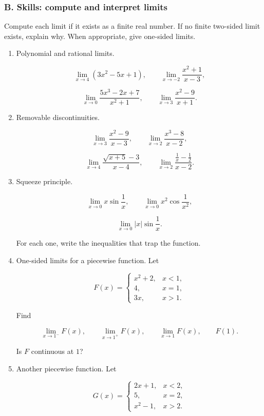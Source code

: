 \subsubsection*{B. Skills: compute and interpret limits}

Compute each limit if it exists as a finite real number.  If no finite two-sided limit exists, explain why.  When appropriate, give one-sided limits.

\begin{enumerate}
\item Polynomial and rational limits.

\[
\lim_{x\to4}(3x^2-5x+1),
\qquad
\lim_{x\to-2}\frac{x^2+1}{x-3},
\]

\[
\lim_{x\to0}\frac{5x^3-2x+7}{x^2+1},
\qquad
\lim_{x\to3}\frac{x^2-9}{x+1}.
\]

\item Removable discontinuities.

\[
\lim_{x\to3}\frac{x^2-9}{x-3},
\qquad
\lim_{x\to2}\frac{x^3-8}{x-2},
\]

\[
\lim_{x\to4}\frac{\sqrt{x+5}-3}{x-4},
\qquad
\lim_{x\to2}\frac{\frac1x-\frac12}{x-2}.
\]

\item Squeeze principle.

\[
\lim_{x\to0}x\sin\frac1x,
\qquad
\lim_{x\to0}x^2\cos\frac1{x^2},
\]

\[
\lim_{x\to0}|x|\sin\frac1x.
\]

For each one, write the inequalities that trap the function.

\item One-sided limits for a piecewise function.  Let

\[
F(x)=
\begin{cases}
x^2+2, & x<1,\\
4, & x=1,\\
3x, & x>1.
\end{cases}
\]

Find

\[
\lim_{x\to1^-}F(x),
\qquad
\lim_{x\to1^+}F(x),
\qquad
\lim_{x\to1}F(x),
\qquad
F(1).
\]

Is \(F\) continuous at \(1\)?

\item Another piecewise function.  Let

\[
G(x)=
\begin{cases}
2x+1, & x<2,\\
5, & x=2,\\
x^2-1, & x>2.
\end{cases}
\]


\end{enumerate}
